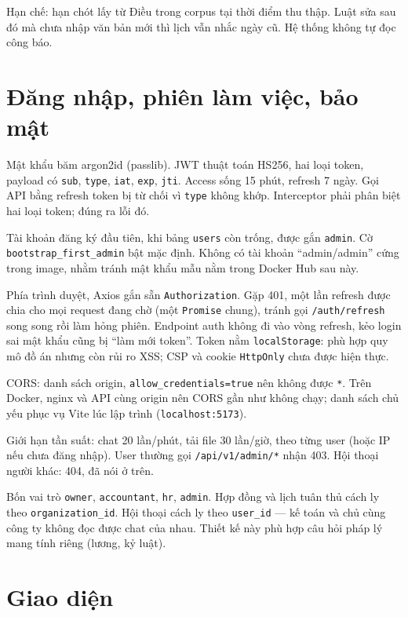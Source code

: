 Hạn chế: hạn chót lấy từ Điều trong corpus tại thời điểm thu thập.
Luật sửa sau đó mà chưa nhập văn bản mới thì lịch vẫn nhắc ngày cũ. Hệ thống
không tự đọc công báo.

\section{Đăng nhập, phiên làm việc, bảo mật}

Mật khẩu băm argon2id (passlib). JWT thuật toán HS256, hai loại token, payload
có \texttt{sub}, \texttt{type}, \texttt{iat}, \texttt{exp}, \texttt{jti}. Access
sống 15 phút, refresh 7 ngày. Gọi API bằng refresh token bị từ chối vì
\texttt{type} không khớp. Interceptor phải phân biệt hai loại token;
đúng ra lỗi đó.

Tài khoản đăng ký đầu tiên, khi bảng \texttt{users} còn trống, được gắn
\texttt{admin}. Cờ \texttt{bootstrap\_first\_admin} bật mặc định. Không có tài
khoản ``admin/admin'' cứng trong image, nhằm tránh mật khẩu mẫu nằm trong
Docker Hub sau này.

Phía trình duyệt, Axios gắn sẵn \texttt{Authorization}. Gặp 401, một lần
refresh được chia cho mọi request đang chờ (một \texttt{Promise} chung), tránh
gọi \texttt{/auth/refresh} song song rồi làm hỏng phiên. Endpoint auth không đi
vào vòng refresh, kẻo login sai mật khẩu cũng bị ``làm mới token''. Token nằm
\texttt{localStorage}: phù hợp quy mô đồ án nhưng còn rủi ro XSS; CSP và cookie \texttt{HttpOnly} chưa được hiện thực.

CORS: danh sách origin, \texttt{allow\_credentials=true} nên không được
\texttt{*}. Trên Docker, nginx và API cùng origin nên CORS gần như không chạy;
danh sách chủ yếu phục vụ Vite lúc lập trình (\texttt{localhost:5173}).

Giới hạn tần suất: chat 20 lần/phút, tải file 30 lần/giờ, theo từng user (hoặc
IP nếu chưa đăng nhập). User thường gọi \texttt{/api/v1/admin/*} nhận 403.
Hội thoại người khác: 404, đã nói ở trên.

Bốn vai trò \texttt{owner}, \texttt{accountant}, \texttt{hr}, \texttt{admin}.
Hợp đồng và lịch tuân thủ cách ly theo \texttt{organization\_id}. Hội thoại
cách ly theo \texttt{user\_id} --- kế toán và chủ cùng công ty không đọc được
chat của nhau. Thiết kế này phù hợp câu hỏi pháp lý mang tính riêng (lương, kỷ luật).

\section{Giao diện}


